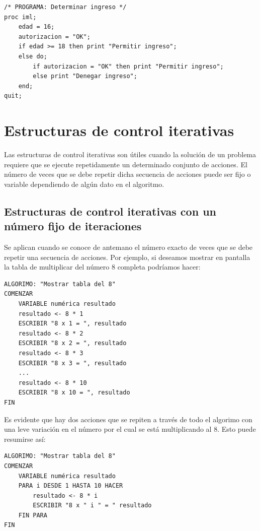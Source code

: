 \documentclass[]{book}
\begin{document}
\begin{verbatim}
/* PROGRAMA: Determinar ingreso */
proc iml;
    edad = 16;
    autorizacion = "OK";
    if edad >= 18 then print "Permitir ingreso";
    else do;
        if autorizacion = "OK" then print "Permitir ingreso";
        else print "Denegar ingreso";
    end;
quit;
\end{verbatim}

\hypertarget{estructuras-de-control-iterativas}{%
\section{Estructuras de control iterativas}\label{estructuras-de-control-iterativas}}

Las estructuras de control iterativas son útiles cuando la solución de un problema requiere que se ejecute repetidamente un determinado conjunto de acciones. El número de veces que se debe repetir dicha secuencia de acciones puede ser fijo o variable dependiendo de algún dato en el algoritmo.

\hypertarget{estructuras-de-control-iterativas-con-un-numero-fijo-de-iteraciones}{%
\subsection{Estructuras de control iterativas con un número fijo de iteraciones}\label{estructuras-de-control-iterativas-con-un-numero-fijo-de-iteraciones}}

Se aplican cuando se conoce de antemano el número exacto de veces que se debe repetir una secuencia de acciones. Por ejemplo, si deseamos mostrar en pantalla la tabla de multiplicar del número 8 completa podríamos hacer:

\begin{verbatim}
ALGORIMO: "Mostrar tabla del 8"
COMENZAR
    VARIABLE numérica resultado
    resultado <- 8 * 1
    ESCRIBIR "8 x 1 = ", resultado
    resultado <- 8 * 2
    ESCRIBIR "8 x 2 = ", resultado
    resultado <- 8 * 3
    ESCRIBIR "8 x 3 = ", resultado
    ...
    resultado <- 8 * 10
    ESCRIBIR "8 x 10 = ", resultado
FIN
\end{verbatim}

Es evidente que hay dos acciones que se repiten a través de todo el algorimo con una leve variación en el número por el cual se está multiplicando al 8. Esto puede resumirse así:

\begin{verbatim}
ALGORIMO: "Mostrar tabla del 8"
COMENZAR
    VARIABLE numérica resultado
    PARA i DESDE 1 HASTA 10 HACER
        resultado <- 8 * i
        ESCRIBIR "8 x " i " = " resultado
    FIN PARA
FIN
\end{verbatim}
\end{document}
